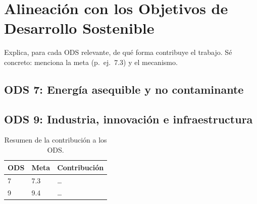 \chapter{Alineación con los Objetivos de Desarrollo Sostenible}\label{anx:ods}

Explica, para cada \ac{ODS} relevante, de qué forma contribuye el trabajo.
Sé concreto: menciona la meta (p.~ej.\ 7.3) y el mecanismo.

\section*{ODS 7: Energía asequible y no contaminante}

\section*{ODS 9: Industria, innovación e infraestructura}

\begin{table}[H]
  \centering
  \caption{Resumen de la contribución a los ODS.}
  \label{tab:ods}
  \begin{tabularx}{\linewidth}{llX}
    \toprule
    ODS & Meta & Contribución \\
    \midrule
    7 & 7.3 & \ldots \\
    9 & 9.4 & \ldots \\
    \bottomrule
  \end{tabularx}
\end{table}
